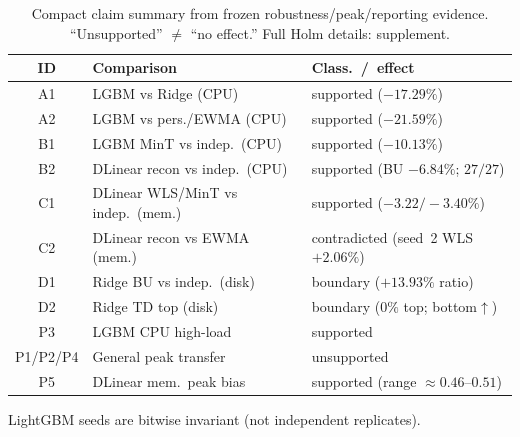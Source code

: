 \begin{table}[width=\columnwidth,pos=!h]
\centering
\caption{Compact claim summary from frozen robustness/peak/reporting evidence.
``Unsupported'' $\neq$ ``no effect.'' Full Holm details: supplement.}
\label{tab:stats}
\begin{threeparttable}
\scriptsize
\setlength{\tabcolsep}{2.2pt}
\begin{tabularx}{\tblwidth}{@{}c>{\raggedright\arraybackslash}X>{\raggedright\arraybackslash}X@{}}
\toprule
ID & Comparison & Class.\ /\ effect \\
\midrule
A1 & LGBM vs Ridge (CPU) & supported ($-17.29\%$) \\
A2 & LGBM vs pers./{EWMA} (CPU) & supported ($-21.59\%$) \\
B1 & LGBM MinT vs indep.\ (CPU) & supported ($-10.13\%$) \\
B2 & DLinear recon vs indep.\ (CPU) & supported (BU $-6.84\%$; $27/27$) \\
C1 & DLinear WLS/MinT vs indep.\ (mem.) & supported ($-3.22/-3.40\%$) \\
C2 & DLinear recon vs {EWMA} (mem.) & contradicted (seed~2 {WLS} $+2.06\%$) \\
D1 & Ridge BU vs indep.\ (disk) & boundary ($+13.93\%$ ratio) \\
D2 & Ridge TD top (disk) & boundary ($0\%$ top; bottom$\uparrow$) \\
P3 & LGBM CPU high-load & supported \\
P1/P2/P4 & General peak transfer & unsupported \\
P5 & DLinear mem.\ peak bias & supported (range $\approx0.46$--$0.51$) \\
\bottomrule
\end{tabularx}
\begin{tablenotes}
\footnotesize
\item LightGBM seeds are bitwise invariant (not independent replicates).
\end{tablenotes}
\end{threeparttable}
\end{table}
